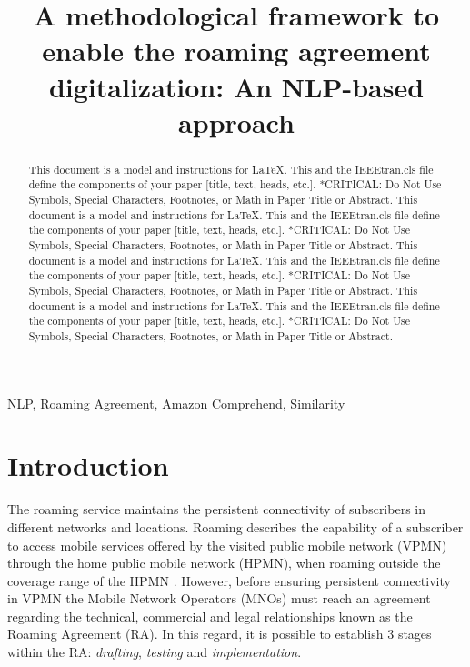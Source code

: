 \documentclass[conference]{style/IEEEtran}
\begin{document}
\title{A methodological framework to enable the roaming agreement digitalization: An NLP-based approach\\}

\maketitle

\begin{abstract}
This document is a model and instructions for \LaTeX.
This and the IEEEtran.cls file define the components of your paper [title, text, heads, etc.]. *CRITICAL: Do Not Use Symbols, Special Characters, Footnotes, 
or Math in Paper Title or Abstract. This document is a model and instructions for \LaTeX.
This and the IEEEtran.cls file define the components of your paper [title, text, heads, etc.]. *CRITICAL: Do Not Use Symbols, Special Characters, Footnotes, 
or Math in Paper Title or Abstract. This document is a model and instructions for \LaTeX.
This and the IEEEtran.cls file define the components of your paper [title, text, heads, etc.]. *CRITICAL: Do Not Use Symbols, Special Characters, Footnotes, 
or Math in Paper Title or Abstract. This document is a model and instructions for \LaTeX.
This and the IEEEtran.cls file define the components of your paper [title, text, heads, etc.]. *CRITICAL: Do Not Use Symbols, Special Characters, Footnotes, 
or Math in Paper Title or Abstract.
\end{abstract}

\begin{IEEEkeywords}
NLP, Roaming Agreement, Amazon Comprehend, Similarity
\end{IEEEkeywords}

\section{Introduction}
The roaming service maintains the persistent connectivity of subscribers in different networks and locations. Roaming describes the capability of a subscriber to access mobile services offered by the visited public mobile network (VPMN) through the home public mobile network (HPMN), when roaming outside the coverage range of the HPMN \cite{Tanaka2013}. However, before ensuring persistent connectivity in VPMN the Mobile Network Operators (MNOs) must reach an agreement regarding the technical, commercial and legal relationships known as the Roaming Agreement (RA). In this regard, it is possible to establish 3 stages within the RA: \textit{drafting}, \textit{testing} and \textit{implementation}.
\end{document}
